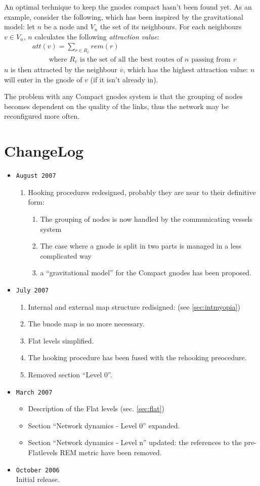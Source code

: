 \documentclass[a4paper]{article}
\newcommand{\T}[1]{\textrm{#1}}
\newcommand{\eal}[1]{{\begin{align*} #1 \end{align*}}}
\def\ove#1{{\overline{#1}}}
\newcommand{\qq}{\qquad}
\begin{document}
An optimal technique to keep the gnodes compact hasn't been found yet. As an
example, consider the following, which has been inspired by the gravitational
model: let $n$ be a node and $V_n$ the set of its
neighbours. For each neighbours $v\in V_n$, $n$ calculates the following
\emph{attraction value}:
\eal{&att(v) = \sum_{r\in R_v} rem(r)\\
&\qq\T{ where $R_v$ is the set of all the best routes of $n$ passing from $v$}
}
$n$ is then attracted by the neighbour $\ove v$, which has the highest
attraction value: $n$ will enter in the gnode of $v$ (if it isn't already in).

The problem with any Compact gnodes system is that the grouping of nodes
becomes dependent on the quality of the links, thus the network may be
reconfigured more often.

\section{ChangeLog}
\begin{itemize}
	\item \verb|August 2007|
		\begin{enumerate}
			\item Hooking procedures redesigned, probably they are
				near to their definitive form:
				\begin{enumerate}
					\item The grouping of nodes is now
						handled by the communicating
						vessels system
					\item The case where a gnode is
						split in two parts is managed
						in a less complicated way
					\item a ``gravitational model'' for
						the Compact gnodes has been
						proposed.
				\end{enumerate}
		\end{enumerate}
	\item \verb|July 2007|
		\begin{enumerate}
			\item Internal and external map structure redisigned:
				(see \ref{sec:intmyopia})
			\item The bnode map is no more necessary.
			\item Flat levels simplified.
			\item The hooking procedure has been fused with the
				rehooking preocedure.
			\item Removed section ``Level 0''.
		\end{enumerate}
	\item \verb|March 2007|
		\begin{itemize}
			\item Description of the Flat levels (sec. \ref{sec:flat})
			\item Section ``Network dynamics - Level 0'' expanded.
			\item Section ``Network
				dynamics - Level n'' updated: the references to
				the pre-Flatlevels REM metric have been
				removed.
		\end{itemize}
	\item \verb|October 2006|\\
		Initial release.
\end{itemize}
\end{document}
